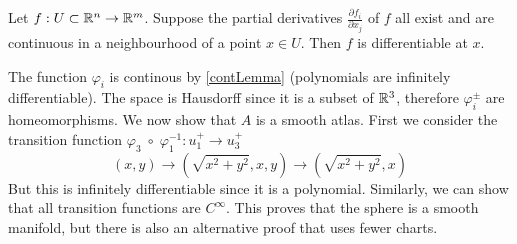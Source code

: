 \documentclass[11pt,a4paper]{report}
\begin{document}
\newline
\begin{Lemma}\label{contLemma}
  Let $f:U \subset \mathbb{R}^n \to \mathbb{R}^m $. Suppose the partial derivatives $\frac{\partial f_i}{\partial x_j}$ of $f$ all exist
  and are continuous in a neighbourhood of a point $x \in U$. Then $f$ is differentiable at $x$. 
\end{Lemma}
The function $\varphi_i$ is continous by \ref{contLemma} (polynomials are infinitely differentiable).
\newline
The space is Hausdorff since it is a subset of $\mathbb{R}^3$, therefore $\varphi_{i}^{\pm}$ are homeomorphisms.
\newline
We now show that $A$ is a smooth atlas. First we consider the transition function $ \varphi_3 \; \circ \; \varphi_1^{-1}: u_1^{+} \to u_3^{+}$
$$(x,y) \to (\sqrt{x^2+y^2},x,y) \to (\sqrt{x^2+y^2},x)$$
But this is infinitely differentiable since it is a polynomial. Similarly, we can show that all transition functions are $C^{\infty}$.
This proves that the sphere is a smooth manifold, but there is also an alternative proof that uses fewer charts.
\end{document}
